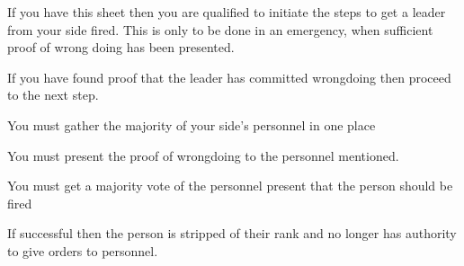 \documentclass[green]{guildcamp3}
\begin{document}
	
	\name{\gYouAreFired{}}
	
	
	
	
	
	If you have this sheet then you are qualified to initiate the steps to get a leader from your side fired. This is only to be done in an emergency, when sufficient proof of wrong doing has been presented. 
	
	
	
	
	\begin{enum}[Directions]
		\item If you have found proof that the leader has committed wrongdoing then proceed to the next step.
		\item You must gather the majority of your side's personnel in one place
		\item You must present the proof of wrongdoing to the personnel mentioned.
		\item You must get a majority vote of the personnel present that the person should be fired
		\item If successful then the person is stripped of their rank and no longer has authority to give orders to personnel.
		
		
	\end{enum}
	
\end{document}
